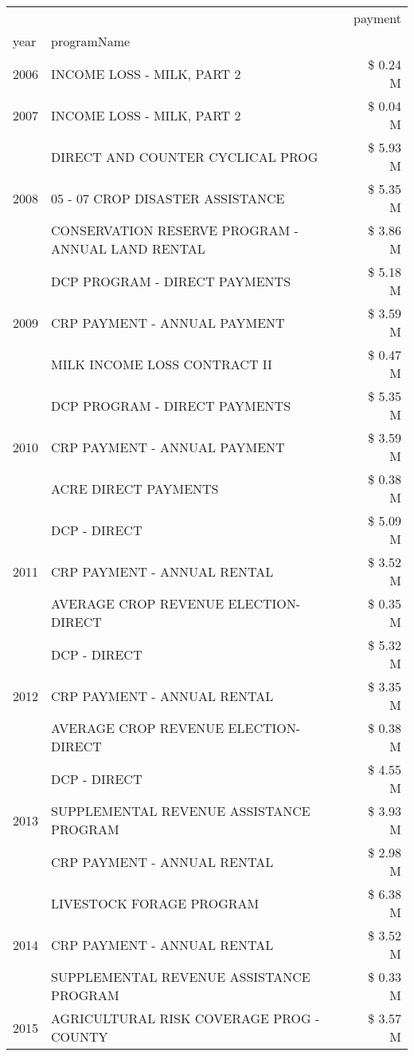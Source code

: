 \begin{tabular}{llr}
\toprule
 &  & payment \\
year & programName &  \\
\midrule
2006 & INCOME LOSS - MILK, PART 2 & \$ 0.24 M \\
\cline{1-3}
2007 & INCOME LOSS - MILK, PART 2 & \$ 0.04 M \\
\cline{1-3}
\multirow[t]{3}{*}{2008} & DIRECT AND COUNTER CYCLICAL PROG & \$ 5.93 M \\
 & 05 - 07 CROP DISASTER ASSISTANCE & \$ 5.35 M \\
 & CONSERVATION RESERVE PROGRAM - ANNUAL LAND RENTAL & \$ 3.86 M \\
\cline{1-3}
\multirow[t]{3}{*}{2009} & DCP PROGRAM - DIRECT PAYMENTS & \$ 5.18 M \\
 & CRP PAYMENT - ANNUAL PAYMENT & \$ 3.59 M \\
 & MILK INCOME LOSS CONTRACT II & \$ 0.47 M \\
\cline{1-3}
\multirow[t]{3}{*}{2010} & DCP PROGRAM - DIRECT PAYMENTS & \$ 5.35 M \\
 & CRP PAYMENT - ANNUAL PAYMENT & \$ 3.59 M \\
 & ACRE DIRECT PAYMENTS & \$ 0.38 M \\
\cline{1-3}
\multirow[t]{3}{*}{2011} & DCP - DIRECT & \$ 5.09 M \\
 & CRP PAYMENT - ANNUAL RENTAL & \$ 3.52 M \\
 & AVERAGE CROP REVENUE ELECTION-DIRECT & \$ 0.35 M \\
\cline{1-3}
\multirow[t]{3}{*}{2012} & DCP - DIRECT & \$ 5.32 M \\
 & CRP PAYMENT - ANNUAL RENTAL & \$ 3.35 M \\
 & AVERAGE CROP REVENUE ELECTION-DIRECT & \$ 0.38 M \\
\cline{1-3}
\multirow[t]{3}{*}{2013} & DCP - DIRECT & \$ 4.55 M \\
 & SUPPLEMENTAL REVENUE ASSISTANCE PROGRAM & \$ 3.93 M \\
 & CRP PAYMENT - ANNUAL RENTAL & \$ 2.98 M \\
\cline{1-3}
\multirow[t]{3}{*}{2014} & LIVESTOCK FORAGE PROGRAM & \$ 6.38 M \\
 & CRP PAYMENT - ANNUAL RENTAL & \$ 3.52 M \\
 & SUPPLEMENTAL REVENUE ASSISTANCE PROGRAM & \$ 0.33 M \\
\cline{1-3}
\multirow[t]{3}{*}{2015} & AGRICULTURAL RISK COVERAGE PROG - COUNTY & \$ 3.57 M \\

\end{tabular}
